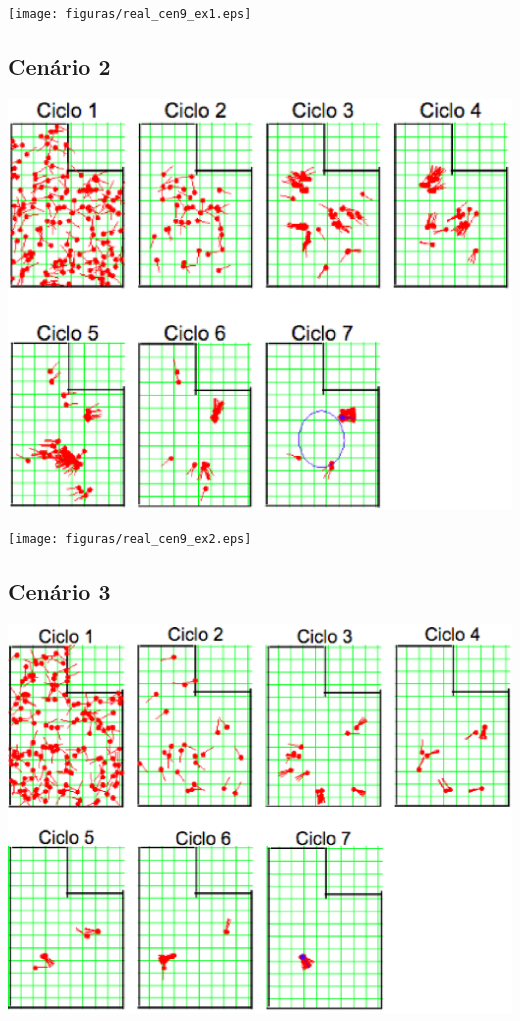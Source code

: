 {\centering
\texttt{[image: figuras/real\_cen9\_ex1.eps]}
\label{img:real_cen9_ex1}
\par}

\subsection{Cenário 2}

{\centering
\includegraphics[scale=0.4]{figuras/cen9_ex2.eps}
\label{img:cen9_ex2}
\par}

{\centering
\texttt{[image: figuras/real\_cen9\_ex2.eps]}
\label{img:real_cen9_ex2}
\par}

\subsection{Cenário 3}

{\centering
\includegraphics[scale=0.4]{figuras/cen9_ex3.eps}
\label{img:cen9_ex3}
\par}

